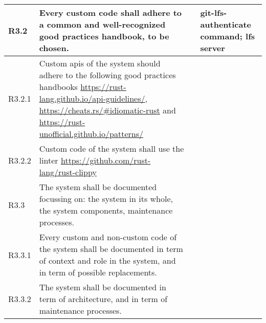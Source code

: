 \documentclass[a4paper,11pt]{article}
\begin{document}
\begin{landscape}
\begin{longtable}{|p{1cm}|p{19cm}|p{2cm}|p{3cm}|}
        \rowcolor[HTML]{DDFFDD}        R3.2       & Every custom code shall adhere to a common and well-recognized good practices handbook, to be chosen.                                                                                                                                                                                 &                       & git-lfs-authenticate command; lfs server \\ \hline
        \rowcolor[HTML]{EEFFEE}        R3.2.1     & Custom apis of the system should adhere to the following good practices handbooks \url{https://rust-lang.github.io/api-guidelines/}, \url{https://cheats.rs/#idiomatic-rust} and \url{https://rust-unofficial.github.io/patterns/}                                                    &                       &                                          \\\hline
        \rowcolor[HTML]{EEFFEE}        R3.2.2     & Custom code of the system shall use the linter \url{https://github.com/rust-lang/rust-clippy}                                                                                                                                                                                         &                       &                                          \\\hline
        \rowcolor[HTML]{FFDDDD}        R3.3       & The system shall be documented focussing on: the system in its whole, the system components, maintenance processes.                                                                                                                                                                   &                       &                                          \\ \hline
        \rowcolor[HTML]{FFEEEE}        R3.3.1     & Every custom and non-custom code of the system shall be documented in term of context and role in the system, and in term of possible replacements.                                                                                                                                   &                       &                                          \\\hline
        \rowcolor[HTML]{FFEEEE}        R3.3.2     & The system shall be documented in term of architecture, and in term of maintenance processes.                                                                                                                                                                                         &                       &                                          \\\hline

\end{longtable}
\end{landscape}
\end{document}

